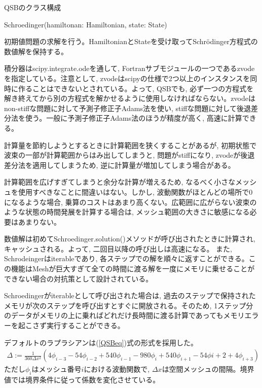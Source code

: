 \documentclass[a4paper, lualatex]{bxjsarticle}
\newcommand{\eref}[1]{(\ref{#1})式}
\begin{document}
\begin{section}{QSBのクラス構成\label{AppQ}}
    \begin{subsection}{Schroedinger(hamiltonan: Hamiltonian, state: State)}
        \par 初期値問題の求解を行う。HamiltonianとStateを受け取ってSchrödinger方程式の数値解を保持する。
        \par 積分器はscipy.integrate.odeを通して, Fortranサブモジュールの一つであるzvodeを指定している。注意として, zvodeはscipyの仕様で2つ以上のインスタンスを同時に作ることはできないとされている。よって, QSBでも, 必ず一つの方程式を解き終えてから別の方程式を解かせるように使用しなければならない。zvodeはnon-stiffな問題に対して予測子修正子Adams法を使い, stiffな問題に対して後退差分法を使う。一般に予測子修正子Adams法のほうが精度が高く, 高速に計算できる。
        \par 計算量を節約しようとするときに計算範囲を狭くすることがあるが, 初期状態で波束の一部が計算範囲からはみ出してしまうと, 問題がstiffになり, zvodeが後退差分法を適用してしまうため, 逆に計算量が増加してしまう場合がある。
        \par 計算範囲を広げすぎてしまうと余分な計算が増えるため, なるべく小さなメッシュを使用すべきなことに間違いはない。しかし, 波動関数がほとんどの場所で0になるような場合, 乗算のコストはあまり高くない。広範囲に広がらない波束のような状態の時間発展を計算する場合は, メッシュ範囲の大きさに敏感になる必要はあまりない。
        \par 数値解は初めてSchroedinger.solution()メソッドが呼び出されたときに計算され, キャッシュされる。よって, 二回目以降の呼び出しは高速になる。 また, Schrodeingerはiterableであり, 各ステップでの解を順々に返すことができる。この機能はMeshが巨大すぎて全ての時間に渡る解を一度にメモリに乗せることができない場合の対抗策として設計されている。
        \par Schroedingerがiterableとして呼び出された場合は, 過去のステップで保持されたメモリが次のステップを呼び出すとすぐに開放される。そのため, 1ステップ分のデータがメモリの上に乗ればどれだけ長時間に渡る計算であってもメモリエラーを起こさず実行することができる。
        \par デフォルトのラプラシアンは\eref{QSBeq}の形式を採用した。
        \begin{align}
            \Delta := \frac{1}{360\varDelta x^2} \left(4\phi_{i-3} - 54\phi_{i-2} + 540\phi_{i-1} - 980\phi_{i} + 540\phi_{i+1} - 54\phi{i+2} + 4\phi_{i+3}\right)\label{QSBeq}
        \end{align}
        ただし$\phi_i$はメッシュ番号$i$における波動関数で, $\varDelta x$は空間メッシュの間隔。境界値では境界条件に従って係数を変化させている。

\end{subsection}
\end{section}
\end{document}

